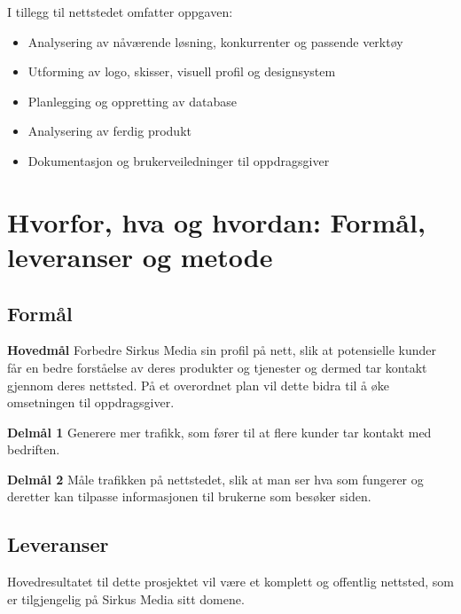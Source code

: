 I tillegg til nettstedet omfatter oppgaven: 
\begin{itemize}
\item Analysering av nåværende løsning, konkurrenter og passende verktøy
\item Utforming av logo, skisser, visuell profil og designsystem
\item Planlegging og oppretting av database
\item Analysering av ferdig produkt
\item Dokumentasjon og brukerveiledninger til oppdragsgiver
\end{itemize}

\section{Hvorfor, hva og hvordan: Formål, leveranser og metode}
\label{sec:maal-metode-resultater}
\subsection{Formål}
\label{sec:maal}
\begin{compactitem}
\item [{\bf Hovedmål}] Forbedre Sirkus Media sin profil på nett, slik at potensielle kunder får en bedre forståelse av deres produkter og tjenester og dermed tar kontakt gjennom deres nettsted. På et overordnet plan vil dette bidra til å øke omsetningen til oppdragsgiver.
\begin{compactitem}
\item [{\bf  Delmål 1} ] Generere mer trafikk, som fører til at flere kunder tar kontakt med bedriften. 
\item [{\bf  Delmål 2} ] Måle trafikken på nettstedet, slik at man ser hva som fungerer og deretter kan tilpasse informasjonen til brukerne som besøker siden.
\end{compactitem}
\end{compactitem}

\subsection{Leveranser}
\label{sec:resultater}
Hovedresultatet til dette prosjektet vil være et komplett og offentlig nettsted, som er tilgjengelig på Sirkus Media sitt domene.


